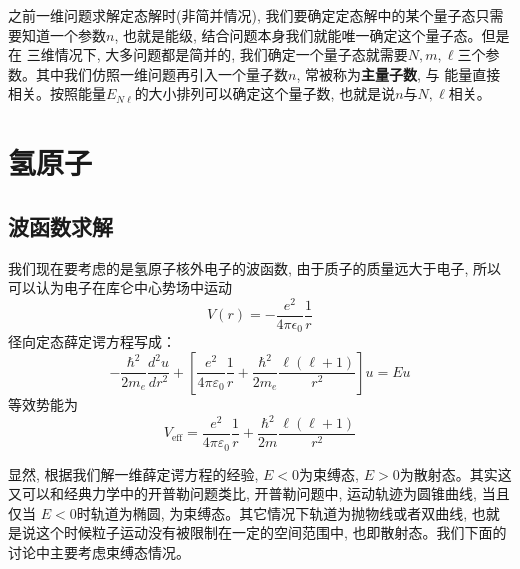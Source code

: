 \documentclass[a4paper,zihao=-4,linespread=1]{ctexrep}
\begin{document}
    之前一维问题求解定态解时(非简并情况), 我们要确定定态解中的某个量子态只需要知道一个参数$n$, 也就是能级, 结合问题本身我们就能唯一确定这个量子态。但是在
    三维情况下, 大多问题都是简并的, 我们确定一个量子态就需要$N,m,\ell$三个参数。其中我们仿照一维问题再引入一个量子数$n$, 常被称为\textbf{主量子数}, 与
    能量直接相关。按照能量$E_{N\ell}$的大小排列可以确定这个量子数, 也就是说$n$与$N,\ell$相关。

    \section{氢原子}
    \subsection{波函数求解}
    我们现在要考虑的是氢原子核外电子的波函数, 由于质子的质量远大于电子, 所以可以认为电子在库仑中心势场中运动\[V(r)=-\frac{e^2}{4\pi\epsilon_0}\frac{1}{r}\]
    径向定态薛定谔方程写成：
    \begin{equation}
        \label{eq:4.33}
        -\frac{\hbar^2}{2m_e}\frac{d^2u}{dr^2}+\left[\frac{e^2}{4\pi\varepsilon_0}\frac{1}{r}+\frac{\hbar^2}{2m_e}\frac{\ell(\ell+1)}{r^2}\right]u=Eu
    \end{equation}
    等效势能为\[V_{\text{eff}}=\frac{e^2}{4\pi\varepsilon_0}\frac{1}{r}+\frac{\hbar^2}{2m}\frac{\ell(\ell+1)}{r^2}\]
    
    显然, 根据我们解一维薛定谔方程的经验, $E<0$为束缚态, $E>0$为散射态。其实这又可以和经典力学中的开普勒问题类比, 开普勒问题中, 运动轨迹为圆锥曲线, 当且仅当
    $E<0$时轨道为椭圆, 为束缚态。其它情况下轨道为抛物线或者双曲线, 也就是说这个时候粒子运动没有被限制在一定的空间范围中, 也即散射态。我们下面的讨论中主要考虑束缚态情况。
\end{document}
